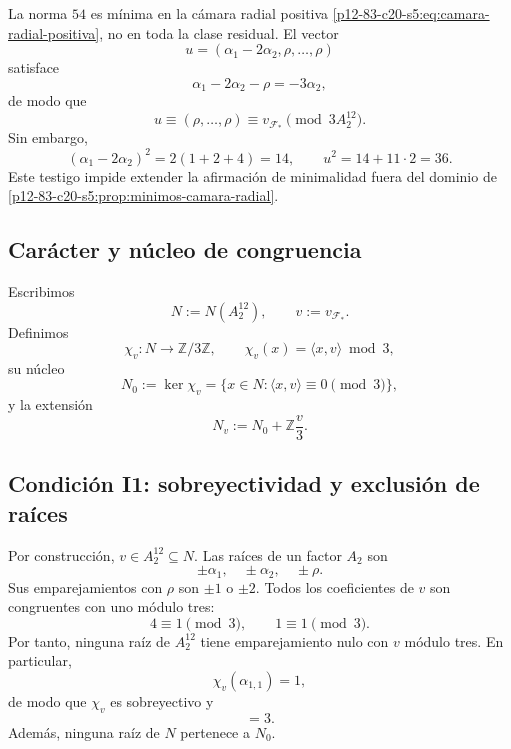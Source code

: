 \begin{remark}
La norma \(54\) es mínima en la cámara radial positiva
\eqref{p12-83-c20-s5:eq:camara-radial-positiva}, no en toda la clase residual. El vector
\[
 u=(\alpha_1-2\alpha_2,\rho,\ldots,\rho)
\]
satisface
\[
 \alpha_1-2\alpha_2-\rho=-3\alpha_2,
\]
de modo que
\[
 u\equiv(\rho,\ldots,\rho)
 \equiv v_{\mathcal F_*}\pmod{3A_2^{12}}.
\]
Sin embargo,
\[
 (\alpha_1-2\alpha_2)^2
 =2(1+2+4)=14,
 \qquad
 u^2=14+11\cdot2=36.
\]
Este testigo impide extender la afirmación de minimalidad fuera del dominio
de \cref{p12-83-c20-s5:prop:minimos-camara-radial}.
\end{remark}

\subsection{Carácter y núcleo de congruencia}

Escribimos
\[
 N:=N(A_2^{12}),
 \qquad
 v:=v_{\mathcal F_*}.
\]
Definimos
\begin{equation}
 \chi_v:N\longrightarrow\mathbb Z/3\mathbb Z,
 \qquad
 \chi_v(x)=\langle x,v\rangle\bmod3,
 \label{p12-83-c20-s5:eq:caracter-vecino-leech}
\end{equation}
su núcleo
\begin{equation}
 N_0:=\ker\chi_v
 =\{x\in N:\langle x,v\rangle\equiv0\pmod3\},
 \label{p12-83-c20-s5:eq:nucleo-congruencia-vecino}
\end{equation}
y la extensión
\begin{equation}
 N_v:=N_0+\mathbb Z\frac v3.
 \label{p12-83-c20-s5:eq:definicion-vecino-indice-tres}
\end{equation}

\subsection{Condición I1: sobreyectividad y exclusión de raíces}

Por construcción, \(v\in A_2^{12}\subseteq N\). Las raíces de un factor
\(A_2\) son
\[
 \pm\alpha_1,
 \quad
 \pm\alpha_2,
 \quad
 \pm\rho.
\]
Sus emparejamientos con \(\rho\) son \(\pm1\) o \(\pm2\). Todos los
coeficientes de \(v\) son congruentes con uno módulo tres:
\[
 4\equiv1\pmod3,
 \qquad
 1\equiv1\pmod3.
\]
Por tanto, ninguna raíz de \(A_2^{12}\) tiene emparejamiento nulo con
\(v\) módulo tres. En particular,
\[
 \chi_v(\alpha_{1,1})=1,
\]
de modo que \(\chi_v\) es sobreyectivo y
\begin{equation}
 [N:N_0]=3.
 \label{p12-83-c20-s5:eq:indice-nucleo-vecino}
\end{equation}
Además, ninguna raíz de \(N\) pertenece a \(N_0\).

